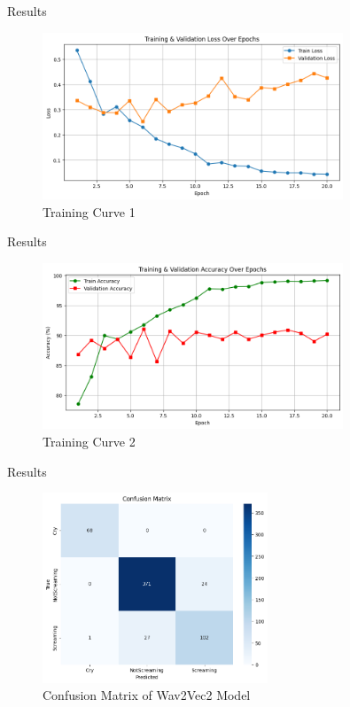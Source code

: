 \documentclass{beamer}
\begin{document}
\begin{frame}{Results}
    
    \begin{figure}
        \centering
        \includegraphics[width=0.8\textwidth]{wav1.png}
        \caption{Training Curve 1}
    \end{figure}

\end{frame}

\begin{frame}{Results}
    
    \begin{figure}
        \centering
        \includegraphics[width=0.8\textwidth]{wav2.png}
        \caption{Training Curve 2}
    \end{figure}

\end{frame}

\begin{frame}{Results}
    
    \begin{figure}
        \centering
        \includegraphics[width=0.6\textwidth]{wav3.png}
        \caption{Confusion Matrix of Wav2Vec2 Model}
    \end{figure}

\end{frame}
\end{document}
